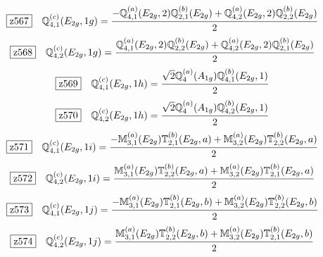 \documentclass[fleqn,10pt,landscape]{jsarticle}
\begin{document}
\begin{dmath*}
\hspace*{3mm}\fbox{z567}\quad \mathbb{Q}_{4,1}^{(c)}(E_{2g},1g)=\frac{- \mathbb{Q}_{4,1}^{(a)}(E_{2g},2) \mathbb{Q}_{2,1}^{(b)}(E_{2g}) + \mathbb{Q}_{4,2}^{(a)}(E_{2g},2) \mathbb{Q}_{2,2}^{(b)}(E_{2g})}{2}
\end{dmath*}
\begin{dmath*}
\hspace*{3mm}\fbox{z568}\quad \mathbb{Q}_{4,2}^{(c)}(E_{2g},1g)=\frac{\mathbb{Q}_{4,1}^{(a)}(E_{2g},2) \mathbb{Q}_{2,2}^{(b)}(E_{2g}) + \mathbb{Q}_{4,2}^{(a)}(E_{2g},2) \mathbb{Q}_{2,1}^{(b)}(E_{2g})}{2}
\end{dmath*}
\begin{dmath*}
\hspace*{3mm}\fbox{z569}\quad \mathbb{Q}_{4,1}^{(c)}(E_{2g},1h)=\frac{\sqrt{2} \mathbb{Q}_{4}^{(a)}(A_{1g}) \mathbb{Q}_{4,1}^{(b)}(E_{2g},1)}{2}
\end{dmath*}
\begin{dmath*}
\hspace*{3mm}\fbox{z570}\quad \mathbb{Q}_{4,2}^{(c)}(E_{2g},1h)=\frac{\sqrt{2} \mathbb{Q}_{4}^{(a)}(A_{1g}) \mathbb{Q}_{4,2}^{(b)}(E_{2g},1)}{2}
\end{dmath*}
\begin{dmath*}
\hspace*{3mm}\fbox{z571}\quad \mathbb{Q}_{4,1}^{(c)}(E_{2g},1i)=\frac{- \mathbb{M}_{3,1}^{(a)}(E_{2g}) \mathbb{T}_{2,1}^{(b)}(E_{2g},a) + \mathbb{M}_{3,2}^{(a)}(E_{2g}) \mathbb{T}_{2,2}^{(b)}(E_{2g},a)}{2}
\end{dmath*}
\begin{dmath*}
\hspace*{3mm}\fbox{z572}\quad \mathbb{Q}_{4,2}^{(c)}(E_{2g},1i)=\frac{\mathbb{M}_{3,1}^{(a)}(E_{2g}) \mathbb{T}_{2,2}^{(b)}(E_{2g},a) + \mathbb{M}_{3,2}^{(a)}(E_{2g}) \mathbb{T}_{2,1}^{(b)}(E_{2g},a)}{2}
\end{dmath*}
\begin{dmath*}
\hspace*{3mm}\fbox{z573}\quad \mathbb{Q}_{4,1}^{(c)}(E_{2g},1j)=\frac{- \mathbb{M}_{3,1}^{(a)}(E_{2g}) \mathbb{T}_{2,1}^{(b)}(E_{2g},b) + \mathbb{M}_{3,2}^{(a)}(E_{2g}) \mathbb{T}_{2,2}^{(b)}(E_{2g},b)}{2}
\end{dmath*}
\begin{dmath*}
\hspace*{3mm}\fbox{z574}\quad \mathbb{Q}_{4,2}^{(c)}(E_{2g},1j)=\frac{\mathbb{M}_{3,1}^{(a)}(E_{2g}) \mathbb{T}_{2,2}^{(b)}(E_{2g},b) + \mathbb{M}_{3,2}^{(a)}(E_{2g}) \mathbb{T}_{2,1}^{(b)}(E_{2g},b)}{2}
\end{dmath*}
\end{document}

